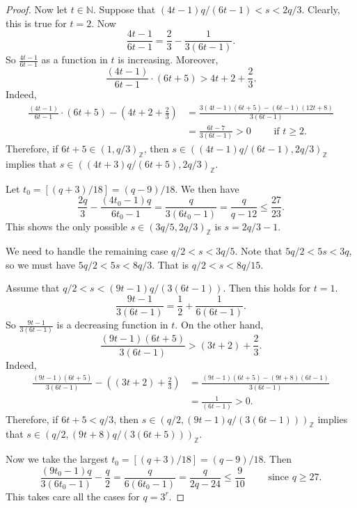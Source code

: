 \documentclass{amsart}[11pt]
\theoremstyle{definition}
\numberwithin{equation}{section}
\theoremstyle{notitle}
\begin{document}
\begin{proof}
Now let $t\in {\mathbb{N}}$. Suppose that
$(4t-1)q/(6t-1)<s < 2q/3$. Clearly, this is true for $t=2$. Now 
\[\frac{4t-1}{6t-1}= \frac{2}{3}-\frac{1}{3(6t-1)}.\]
So $\frac{4t-1}{6t-1}$ as a function in $t$ is increasing. 
Moreover, 
\[ \frac{(4t-1)}{6t-1}\cdot (6t+5) > 4t+2+\frac{2}{3}.\]
Indeed, 
\[
\begin{split}
\frac{(4t-1)}{6t-1}\cdot (6t+5) - (4t+2+\frac{2}{3})&=
\frac{3(4t-1)(6t+5)-(6t-1)(12t+8)}{3(6t-1)}  \\
&= \frac{6t-7}{3(6t-1)}> 0 \qquad \text{ if } t \geq 2.
\end{split}
\]
Therefore, if $6t+5\in (1, q/3)_{\mathbb{Z}}$, then $s\in ((4t-1)q/(6t-1),
2q/3)_{\mathbb{Z}}$ implies that $s\in ((4t+3)q/(6t+5),
2q/3)_{\mathbb{Z}}$. 

Let $t_0= [(q+3)/18]= (q-9)/18$. We then have 
\[ \frac{2q}{3}-\frac{(4t_0-1)q}{6t_0-1}=
\frac{q}{3(6t_0-1)}=\frac{q}{q-12}\leq \frac{27}{23}.\]   
This shows the  only possible $s\in (3q/5, 2q/3)_{\mathbb{Z}}$ is $s= 2q/3-1$. 

We need to handle the remaining case $q/2<s < 3q/5$. Note that $5q/2<
5s < 3q$, so we must have $5q/2< 5s < 8q/3$. That is $q/2< s< 8q/15$. 

Assume that $q/2<s< (9t-1)q/(3(6t-1))$. Then this holds for $t=1$. 
\[ \frac{9t-1}{3(6t-1)}= \frac{1}{2}+\frac{1}{6(6t-1)}.\]
So $\frac{9t-1}{3(6t-1)}$ is a decreasing function in $t$. 
On the other hand, 
\[ \frac{(9t-1)(6t+5)}{3(6t-1)} > (3t+2)+\frac{2}{3}. \]
Indeed, 
\[
\begin{split}
\frac{(9t-1)(6t+5)}{3(6t-1)}- ((3t+2)+\frac{2}{3})&=
\frac{(9t-1)(6t+5)-(9t+8)(6t-1) }{3(6t-1)}\\
&=\frac{1}{(6t-1)}>0.
\end{split}\]
Therefore, if $6t+5< q/3$, then $s\in (q/2,(9t-1)q/(3(6t-1)))_{\mathbb{Z}}$
implies that $s\in (q/2,(9t+8)q/(3(6t+5)))_{\mathbb{Z}}$. 

Now we take the largest $t_0= [(q+3)/18]= (q-9)/18$. Then 
\[\frac{(9t_0-1)q}{3(6t_0-1)}-\frac{q}{2}=\frac{q}{6(6t_0-1)}=
\frac{q}{2q-24}\leq \frac{9}{10} \qquad \text{ since } q\geq 27. \]
This takes care all the cases for $q=3^r$. 
\end{proof}

 
 
 
 
\end{document}
